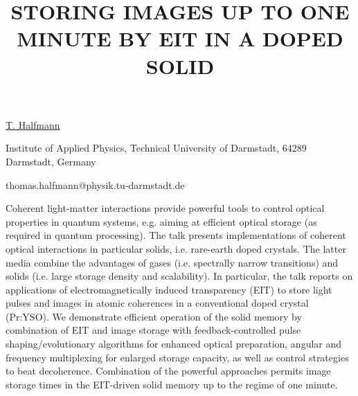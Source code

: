 \title{STORING IMAGES UP TO ONE MINUTE BY EIT IN A DOPED SOLID}

\underline{T. Halfmann} 

{\normalsize{\vspace{-4mm}
Institute of Applied Physics, Technical University of Darmstadt,
64289 Darmstadt, Germany

\email thomas.halfmann@physik.tu-darmstadt.de}}

Coherent light-matter interactions provide powerful tools to control optical properties in quantum systems, e.g. aiming at efficient optical storage (as required in quantum processing). The talk presents implementations of coherent optical interactions in particular solids, i.e. rare-earth doped crystals. The latter media combine the advantages of gases (i.e. spectrally narrow transitions) and solids (i.e. large storage density and scalability). In particular, the talk reports on applications of electromagnetically induced transparency (EIT) to store light pulses and images in atomic coherences in a conventional doped crystal (Pr:YSO). We demonstrate efficient operation of the solid memory by combination of EIT and image storage with feedback-controlled pulse shaping/evolutionary algorithms for enhanced optical preparation, angular and frequency multiplexing for enlarged storage capacity, as well as control strategies to beat decoherence. Combination of the powerful approaches permits image storage times in the EIT-driven solid memory up to the regime of one minute.

\vspace{\baselineskip}
